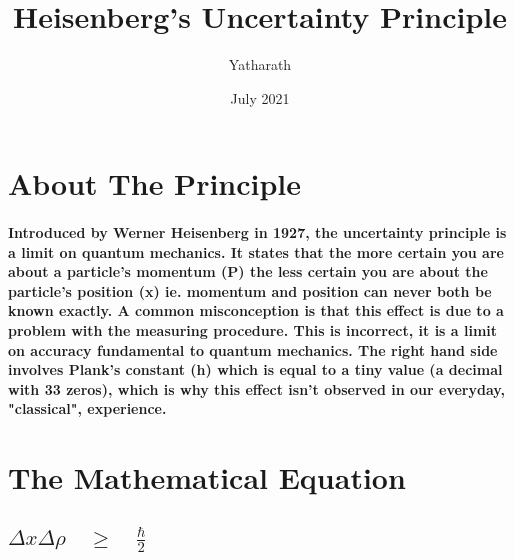 \documentclass{article}
\title{Heisenberg's Uncertainty Principle}
\author{Yatharath}
\date{July 2021}
\begin{document}
\maketitle

\section*{About The Principle}
\paragraph{Introduced by Werner Heisenberg in 1927, the uncertainty principle is a limit on quantum mechanics. It states that the more certain you are about a particle's momentum (P) the less certain you are about the particle's position (x) ie. momentum and position can never both be known exactly. A common misconception is that this effect is due to a problem with the measuring procedure. This is incorrect, it is a limit on accuracy fundamental to quantum mechanics. The right hand side involves Plank's constant (h) which is equal to a tiny value (a decimal with 33 zeros), which is why this effect isn't observed in our everyday, "classical", experience.}
\section*{The Mathematical Equation}
\begin{center}
\section*{${ \Delta }{ x }{ \Delta }{\rho }\quad\ge\quad\frac{ \hbar }{ 2 }$}
\end{center}
\end{document}
